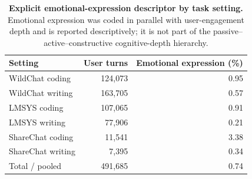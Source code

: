 \begin{table}[!htbp]
\footnotesize
\centering
\caption{\textbf{Explicit emotional-expression descriptor by task setting.} Emotional expression was coded in parallel with user-engagement depth and is reported descriptively; it is not part of the passive--active--constructive cognitive-depth hierarchy.}
\label{tab:emotional_expression_summary}
\setlength{\tabcolsep}{7pt}
\renewcommand{\arraystretch}{1.04}
\begin{tabular}{lrr}
\toprule
Setting & User turns & Emotional expression (\%) \\
\midrule
WildChat coding & 124,073 & 0.95 \\
WildChat writing & 163,705 & 0.57 \\
LMSYS coding & 107,065 & 0.91 \\
LMSYS writing & 77,906 & 0.21 \\
ShareChat coding & 11,541 & 3.38 \\
ShareChat writing & 7,395 & 0.34 \\
\midrule
Total / pooled & 491,685 & 0.74 \\
\bottomrule
\end{tabular}
\end{table}
